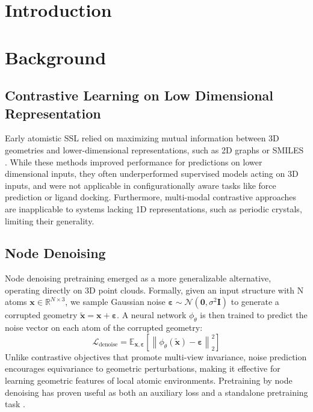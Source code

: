 \documentclass{article}
\theoremstyle{plain}
\theoremstyle{definition}
\theoremstyle{remark}
\begin{document}
\section{Introduction}


\section{Background}
\subsection{Contrastive Learning on Low Dimensional Representation}
Early atomistic SSL relied on maximizing mutual information between 3D geometries and lower-dimensional representations, such as 2D graphs or SMILES \cite{GraphMVP_liu2022, 3dinfomax_stärk2022, attrmasking_hu2020}. While these methods improved performance for predictions on lower dimensional inputs, they often underperformed supervised models acting on 3D inputs, and were not applicable in configurationally aware tasks like force prediction or ligand docking. Furthermore, multi-modal contrastive approaches are inapplicable to systems lacking 1D representations, such as periodic crystals, limiting their generality.

\subsection{Node Denoising}
Node denoising pretraining emerged as a more generalizable alternative, operating directly on 3D point clouds. Formally, given an input structure with N atoms $\mathbf{x} \in \mathbb{R}^{N\times3}$, we sample Gaussian noise $\boldsymbol{\varepsilon} \sim \mathcal{N}(\mathbf{0}, \sigma^{2}\mathbf{I})$ to generate a corrupted geometry $\tilde{\mathbf{x}} = \mathbf{x} + \boldsymbol{\varepsilon}$. A neural network $\phi_{\theta}$ is then trained to predict the noise vector on each atom of the corrupted geometry:
\begin{equation}
\label{eq:denoising}
\mathcal{L}_{\text{denoise}} = \mathbb{E}_{\mathbf{x}, \boldsymbol{\varepsilon}} \left[ \left\lVert \phi_{\theta}(\tilde{\mathbf{x}}) - \boldsymbol{\varepsilon} \right\rVert_{2}^{2} \right]
\end{equation}
Unlike contrastive objectives that promote multi-view invariance, noise prediction encourages equivariance to geometric perturbations, making it effective for learning geometric features of local atomic environments. Pretraining by node denoising  has proven useful as both an auxiliary loss \cite{NoisyNodes_Godwin2022, Equiformer1_Liao2022, EquiformerV2_Liao2023} and a standalone pretraining task \cite{NoisyNodes_Zaidi2023PVD, SE3invDenoise_liu2023, Atomica_Fang2025, EPT_jiao2025}.
\end{document}
